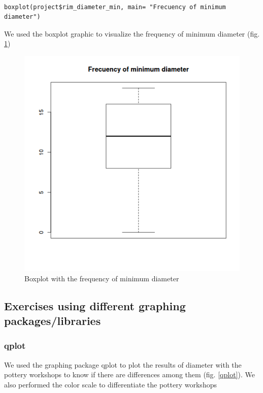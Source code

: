 \documentclass[10pt,a4paper]{article}
\begin{document}
\begin{verbatim}

boxplot(project$rim_diameter_min, main= "Frecuency of minimum diameter")

\end{verbatim}

We used the boxplot graphic to visualize the frequency of minimum diameter (fig. \ref{boxmin})

\begin{figure}[htp]
     \centering
\includegraphics[scale=0.50]{boxplotmin.png}
\caption{Boxplot with the frequency of minimum diameter}
\label{boxmin}
\end{figure} 


\newpage

\subsection{Exercises using different graphing packages/libraries} 


\subsubsection{qplot}

We used the graphing package qplot to plot the results of diameter with the pottery workshops to know if there are differences among them (fig. \ref{qplot}). We also performed the color scale to differentiate the pottery workshops 
\end{document}
